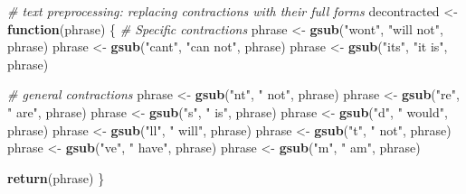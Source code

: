 \documentclass[
  a4paper,
]{article}
\newenvironment{Shaded}{\begin{snugshade}}{\end{snugshade}}
\newcommand{\CommentTok}[1]{\textcolor[rgb]{0.56,0.35,0.01}{\textit{#1}}}
\newcommand{\ControlFlowTok}[1]{\textcolor[rgb]{0.13,0.29,0.53}{\textbf{#1}}}
\newcommand{\FunctionTok}[1]{\textcolor[rgb]{0.13,0.29,0.53}{\textbf{#1}}}
\newcommand{\NormalTok}[1]{#1}
\newcommand{\OtherTok}[1]{\textcolor[rgb]{0.56,0.35,0.01}{#1}}
\newcommand{\StringTok}[1]{\textcolor[rgb]{0.31,0.60,0.02}{#1}}
\begin{document}
\begin{Shaded}
\begin{Highlighting}[]
\CommentTok{\# text preprocessing: replacing contractions with their full forms}
\NormalTok{decontracted }\OtherTok{\textless{}{-}} \ControlFlowTok{function}\NormalTok{(phrase) \{}
  \CommentTok{\# Specific contractions}
\NormalTok{  phrase }\OtherTok{\textless{}{-}} \FunctionTok{gsub}\NormalTok{(}\StringTok{"won\textquotesingle{}t"}\NormalTok{, }\StringTok{"will not"}\NormalTok{, phrase)}
\NormalTok{  phrase }\OtherTok{\textless{}{-}} \FunctionTok{gsub}\NormalTok{(}\StringTok{"can\textquotesingle{}t"}\NormalTok{, }\StringTok{"can not"}\NormalTok{, phrase)}
\NormalTok{  phrase }\OtherTok{\textless{}{-}} \FunctionTok{gsub}\NormalTok{(}\StringTok{"it\textquotesingle{}s"}\NormalTok{, }\StringTok{"it is"}\NormalTok{, phrase)}
  
  \CommentTok{\# general contractions}
\NormalTok{  phrase }\OtherTok{\textless{}{-}} \FunctionTok{gsub}\NormalTok{(}\StringTok{"n\textquotesingle{}t"}\NormalTok{, }\StringTok{" not"}\NormalTok{, phrase)}
\NormalTok{  phrase }\OtherTok{\textless{}{-}} \FunctionTok{gsub}\NormalTok{(}\StringTok{"\textquotesingle{}re"}\NormalTok{, }\StringTok{" are"}\NormalTok{, phrase)}
\NormalTok{  phrase }\OtherTok{\textless{}{-}} \FunctionTok{gsub}\NormalTok{(}\StringTok{"\textquotesingle{}s"}\NormalTok{, }\StringTok{" is"}\NormalTok{, phrase)}
\NormalTok{  phrase }\OtherTok{\textless{}{-}} \FunctionTok{gsub}\NormalTok{(}\StringTok{"\textquotesingle{}d"}\NormalTok{, }\StringTok{" would"}\NormalTok{, phrase)}
\NormalTok{  phrase }\OtherTok{\textless{}{-}} \FunctionTok{gsub}\NormalTok{(}\StringTok{"\textquotesingle{}ll"}\NormalTok{, }\StringTok{" will"}\NormalTok{, phrase)}
\NormalTok{  phrase }\OtherTok{\textless{}{-}} \FunctionTok{gsub}\NormalTok{(}\StringTok{"\textquotesingle{}t"}\NormalTok{, }\StringTok{" not"}\NormalTok{, phrase)}
\NormalTok{  phrase }\OtherTok{\textless{}{-}} \FunctionTok{gsub}\NormalTok{(}\StringTok{"\textquotesingle{}ve"}\NormalTok{, }\StringTok{" have"}\NormalTok{, phrase)}
\NormalTok{  phrase }\OtherTok{\textless{}{-}} \FunctionTok{gsub}\NormalTok{(}\StringTok{"\textquotesingle{}m"}\NormalTok{, }\StringTok{" am"}\NormalTok{, phrase)}
  
  \FunctionTok{return}\NormalTok{(phrase)}
\NormalTok{\}}
\end{Highlighting}
\end{Shaded}
\end{document}
